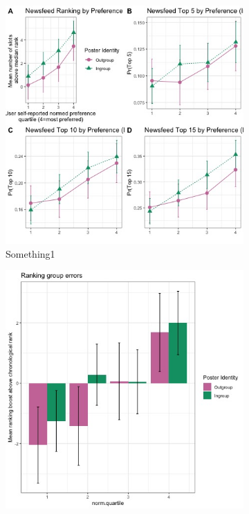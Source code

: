 \documentclass[12pt,letterpaper]{article}
\begin{document}
\begin{figure}[ht]
\caption{NF Beautiful Results}
\label{fig:nf_main}
    \begin{subfigure}{.5\textwidth} 
        \centering
        \includegraphics[width=1\linewidth]{Output/Graphs/Audit/Ranking line graphs/India NF all outcomes panel by norm preference by ingroup.jpg} 
        \caption{Something1}
        \label{fig:nf_line_india}
        \end{subfigure}
    \begin{subfigure}{.5\textwidth}
        \centering
        \includegraphics[width=1\linewidth]{Output/Graphs/Audit/Misranking relative to expectation/Chronological expectation/India NF by norm preference.jpg}  

\end{subfigure}
\end{figure}
\end{document}
